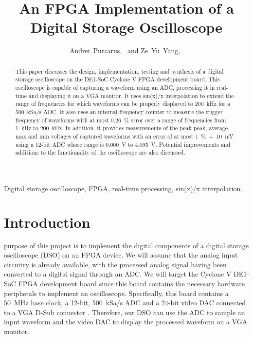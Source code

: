 \documentclass[journal]{IEEEtran}
\title{An FPGA Implementation of a \\ Digital Storage Oscilloscope}
\author{Andrei~Purcarus,~\IEEEmembership{McGill~University} and Ze~Yu~Yang,~\IEEEmembership{McGill~University}}
\begin{document}
\sloppy

\maketitle

\begin{abstract}

This paper discusses the design, implementation, testing and synthesis of a digital storage oscilloscope on the DE1-SoC Cyclone V FPGA development board. This oscilloscope is capable of capturing a waveform using an ADC, processing it in real-time and displaying it on a VGA monitor. It uses sin(x)/x interpolation to extend the range of frequencies for which waveforms can be properly displayed to 200~kHz for a 500~kSa/s ADC. It also uses an internal frequency counter to measure the trigger frequency of waveforms with at most 0.26~\% error over a range of frequencies from 1~kHz to 200~kHz. In addition, it provides measurements of the peak-peak, average, max and min voltages of captured waveforms with an error of at most 1~\%~+~10~mV using a 12-bit ADC whose range is 0.000~V to 4.095~V. Potential improvements and additions to the functionality of the oscilloscope are also discussed.

\end{abstract}

\begin{IEEEkeywords}

Digital storage oscilloscope, FPGA, real-time processing, sin(x)/x interpolation.

\end{IEEEkeywords}

\section{Introduction}

 purpose of this project is to implement the digital components of a digital storage oscilloscope (DSO) on an FPGA device. We will assume that the analog input circuitry is already available, with the processed analog signal having been converted to a digital signal through an ADC. We will target the Cyclone V DE1-SoC FPGA development board since this board contains the necessary hardware peripherals to implement an oscilloscope. Specifically, this board contains a 50~MHz base clock, a 12-bit, 500~kSa/s ADC and a 24-bit video DAC connected to a VGA D-Sub connector \cite{DE1SoC,ltc2308}. Therefore, our DSO can use the ADC to sample an input waveform and the video DAC to display the processed waveform on a VGA monitor.
\end{document}
